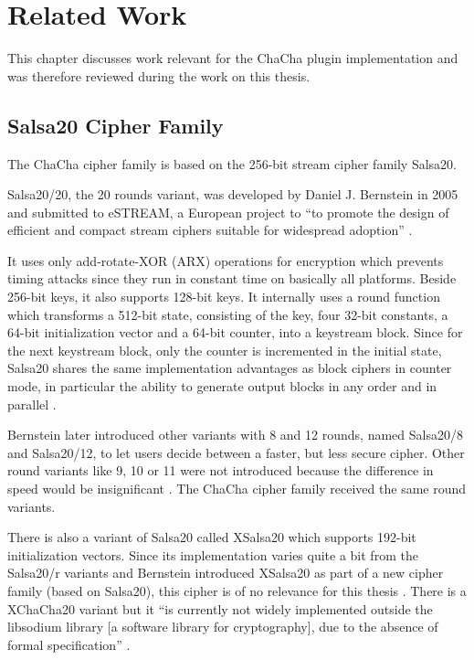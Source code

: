 
\chapter{Related Work}
\label{sec:relatedWork}

This chapter discusses work relevant for the ChaCha plugin implementation and was therefore reviewed during the work on this thesis.

\section{Salsa20 Cipher Family}
\label{sec:salsaCipher}

The ChaCha cipher family is based on the 256-bit stream cipher family Salsa20.

Salsa20/20, the 20 rounds variant, was developed by Daniel J. Bernstein in 2005 \cite{salsaspec} and submitted to eSTREAM, a European project to ``to promote the design of efficient and compact stream ciphers suitable for widespread adoption'' \cite{estream}.

It uses only add-rotate-XOR (ARX) operations for encryption which prevents timing attacks since they run in constant time on basically all platforms. Beside 256-bit keys, it also supports 128-bit keys. It internally uses a round function which transforms a 512-bit state, consisting of the key, four 32-bit constants, a 64-bit initialization vector and a 64-bit counter, into a keystream block. Since for the next keystream block, only the counter is incremented in the initial state, Salsa20 shares the same implementation advantages as block ciphers in counter mode, in particular the ability to generate output blocks in any order and in parallel \cite{salsaspec}.

Bernstein later introduced other variants with 8 and 12 rounds, named Salsa20/8 and Salsa20/12, to let users decide between a faster, but less secure cipher. Other round variants like 9, 10 or 11 were not introduced because the difference in speed would be insignificant \cite{salsa812}. The ChaCha cipher family received the same round variants. 

There is also a variant of Salsa20 called XSalsa20 which supports 192-bit initialization vectors. Since its implementation varies quite a bit from the Salsa20/r variants and Bernstein introduced XSalsa20 as part of a new cipher family (based on Salsa20), this cipher is of no relevance for this thesis \cite{xsalsa20spec}. There is a XChaCha20 variant but it ``is currently not widely implemented outside the libsodium library [a software library for cryptography], due to the absence of formal specification'' \cite{xchacha20}.

